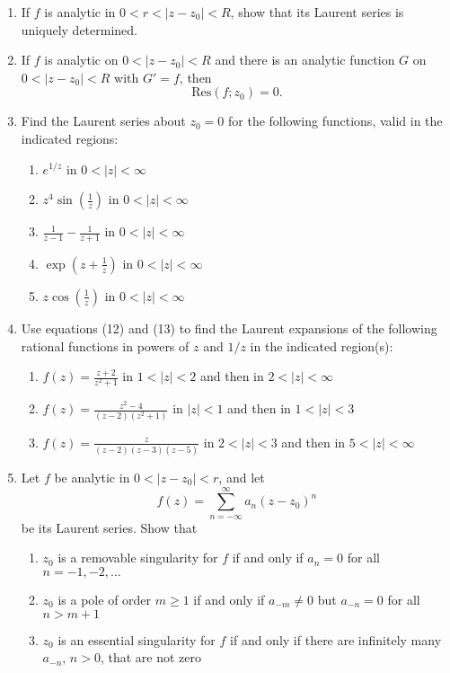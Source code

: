 \documentclass[12pt]{article}
\theoremstyle{definition} %
\theoremstyle{plain} %
\begin{document}
\begin{enumerate}
\item If $f$ is analytic in $0 < r < |z - z_0| < R$, show that its Laurent series is uniquely determined.

\item If $f$ is analytic on $0 < |z - z_0| < R$ and there is an analytic function $G$ on $0 < |z - z_0| < R$ with $G' = f$, then
\[
\text{Res}(f; z_0) = 0.
\]

\item Find the Laurent series about $z_0 = 0$ for the following functions, valid in the indicated regions:
\begin{enumerate}
    \item $e^{1/z}$ in $0 < |z| < \infty$
    \item $z^4 \sin\left( \frac{1}{z} \right)$ in $0 < |z| < \infty$
    \item $\frac{1}{z - 1} - \frac{1}{z + 1}$ in $0 < |z| < \infty$
    \item $\exp\left( z + \frac{1}{z} \right)$ in $0 < |z| < \infty$
    \item $z \cos\left( \frac{1}{z} \right)$ in $0 < |z| < \infty$
\end{enumerate}

\item Use equations (12) and (13) to find the Laurent expansions of the following rational functions in powers of $z$ and $1/z$ in the indicated region(s):
\begin{enumerate}
    \item $f(z) = \frac{z + 2}{z^2 + 1}$ in $1 < |z| < 2$ and then in $2 < |z| < \infty$
    \item $f(z) = \frac{z^2 - 4}{(z - 2)(z^2 + 1)}$ in $|z| < 1$ and then in $1 < |z| < 3$
    \item $f(z) = \frac{z}{(z - 2)(z - 3)(z - 5)}$ in $2 < |z| < 3$ and then in $5 < |z| < \infty$
\end{enumerate}

\item Let $f$ be analytic in $0 < |z - z_0| < r$, and let
\[
f(z) = \sum_{n=-\infty}^{\infty} a_n (z - z_0)^n
\]
be its Laurent series. Show that
\begin{enumerate}
    \item $z_0$ is a removable singularity for $f$ if and only if $a_n = 0$ for all $n = -1, -2, \ldots$
    \item $z_0$ is a pole of order $m \ge 1$ if and only if $a_{-m} \ne 0$ but $a_{-n} = 0$ for all $n > m + 1$
    \item $z_0$ is an essential singularity for $f$ if and only if there are infinitely many $a_{-n}$, $n > 0$, that are not zero
\end{enumerate}


\end{enumerate}
\end{document}

